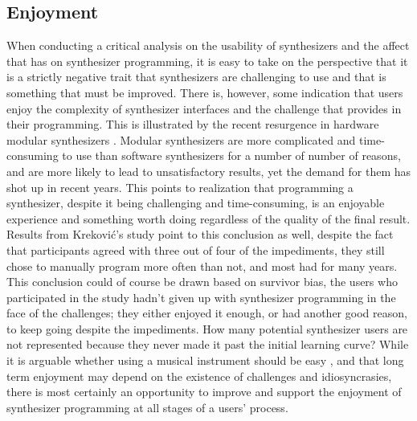 \subsection{Enjoyment}
When conducting a critical analysis on the usability of synthesizers and the affect that has on synthesizer programming, it is easy to take on the perspective that it is a strictly negative trait that synthesizers are challenging to use and that is something that must be improved. There is, however, some indication that users enjoy the complexity of synthesizer interfaces and the challenge that provides in their programming. This is illustrated by the recent resurgence in hardware modular synthesizers \cite{bates2021interface}. Modular synthesizers are more complicated and time-consuming to use than software synthesizers for a number of number of reasons, and are more likely to lead to unsatisfactory results, yet the demand for them has shot up in recent years. This points to realization that programming a synthesizer, despite it being challenging and time-consuming, is an enjoyable experience and something worth doing regardless of the quality of the final result. Results from Krekovi\'{c}'s study point to this conclusion as well, despite the fact that participants agreed with three out of four of the impediments, they still chose to manually program more often than not, and most had for many years. This conclusion could of course be drawn based on survivor bias, the users who participated in the study hadn't given up with synthesizer programming in the face of the challenges; they either enjoyed it enough, or had another good reason, to keep going despite the impediments. How many potential synthesizer users are not represented because they never made it past the initial learning curve? While it is arguable whether using a musical instrument should be easy \cite{mcdermott2013should}, and that long term enjoyment may depend on the existence of challenges and idiosyncrasies, there is most certainly an opportunity to improve and support the enjoyment of synthesizer programming at all stages of a users' process.




